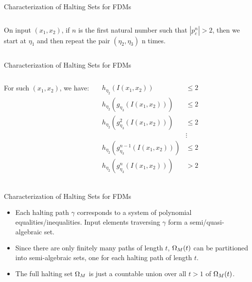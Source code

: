 \documentclass[c]{beamer}
\begin{document}
\begin{frame}{Characterization of Halting Sets for FDMs}

    \begin{columns}
      
      On input $(x_1, x_2)$, if $n$ is the first natural number such that
      $|p_c^n| > 2$, then we start at $\eta_1$ and then repeat the
      pair $(\eta_2, \eta_3)$ n times.
      
      \scaletopagewidth[.9]{\mandelrecfull{}}
    \end{columns}
    
\end{frame}


\begin{frame}{Characterization of Halting Sets for FDMs}

    \begin{columns}
      
      For such $(x_1, x_2)$, we have:

      \begin{align*}
        h_{\eta_2}(I(x_1, x_2)) &\leq 2 \\
        h_{\eta_2}(g_{\eta_3}(I(x_1, x_2))) &\leq 2 \\
        h_{\eta_2}(g^2_{\eta_3}(I(x_1, x_2))) &\leq 2 \\
        &\vdots\\
        h_{\eta_2}(g^{n-1}_{\eta_3}(I(x_1, x_2))) &\leq 2 \\
        h_{\eta_2}(g^{n}_{\eta_3}(I(x_1, x_2))) &> 2 \\
      \end{align*}
      
      \scaletopagewidth[.9]{\mandelrecfull{}}
    \end{columns}    
\end{frame}

\begin{frame}{Characterization of Halting Sets for FDMs}

  \begin{itemize}
  \item[] Each halting path $\gamma$ corresponds to a system of
    polynomial equalities/inequalities.  Input elements traversing
    $\gamma$ form a semi/quasi-algebraic set.
  \item[] Since there are only finitely many paths of length $t$,
    $\Omega_M(t)$ can be partitioned into semi-algebraic sets, one
    for each halting path of length $t$.
  \item[] The full halting set $\Omega_M$ is just a countable union
    over all $t > 1$ of $\Omega_M(t)$.
  \end{itemize}
\end{frame}
\end{document}
